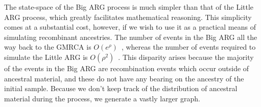 \documentclass[9pt,twocolumn,twoside]{gsajnl}
\begin{document}
The state-space of the Big ARG process is much simpler than that of the Little ARG process,
which greatly facilitates mathematical reasoning. This simplicity comes at a
substantial cost, however, if we wish to use it as a practical means of
simulating recombinant ancestries.
The number of events in the Big ARG all the way back to the GMRCA
is $O(e^\rho)$~\citep{griffiths1997ancestral}, whereas the number
of events required to simulate the Little ARG is
$O(\rho^2)$~\citep{hein2004gene,baumdicker2021efficient}.
This disparity arises because the majority of the events in the Big ARG are
recombination events which occur outside of ancestral material,
and these do not have any bearing on the ancestry of the initial sample.
Because we don't keep track of the distribution of ancestral material during the process,
we generate a vastly larger graph.
\end{document}
